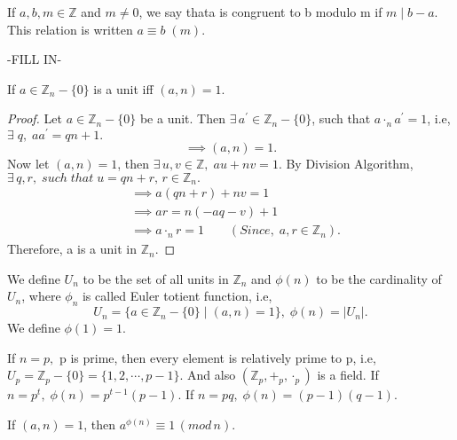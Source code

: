 \documentclass[10pt,a4paper]{article}
\begin{document}
\begin{definition}[]
If $a,b,m\in\mathbb{Z}$ and $m\neq0$, we say thata is congruent to b modulo m if  $m\mid b-a$. This relation is written $a\equiv b\;(m).$
\end{definition}

\begin{definition}
-FILL IN-
\end{definition}

\begin{theorem}
If $a\in\mathbb{Z}_n-\{0\}$ is a unit iff $(a,n)=1.$
\end{theorem}

\begin{proof}
Let $a\in\mathbb{Z}_n-\{0\}$ be a unit. Then $\exists\,a^\prime\in\mathbb{Z}_n-\{0\}$, such that $a\cdot_n a^\prime=1$, i.e, $\exists\;q,\;aa^\prime=qn+1.$ $$\implies (a,n)=1.$$ 
Now let $(a,n)=1$, then $\exists\,u,v\in\mathbb{Z},\;au+nv=1$. By Division Algorithm, $\exists\,q,r,\;such\;that\;u=qn+r,\,r\in\mathbb{Z}_n.$
\begin{align*}
&\implies a(qn+r)+nv=1 \\
&\implies ar=n(-aq-v)+1 \\
&\implies a\cdot_n r=1 \qquad(Since,\;a,r\in\mathbb{Z}_n).
\end{align*}
Therefore, a is a unit in $\mathbb{Z}_n.$
\end{proof}

\begin{definition}
We define $U_n$ to be the set of all units in $\mathbb{Z}_n$ and $\phi(n)$ to be the cardinality of $U_n$, where $\phi_n$ is called Euler totient function, i.e, $$U_n=\{a\in\mathbb{Z}_n-\{0\}\mid (a,n)=1\},\;\phi(n)=\vert U_n\vert.$$
We define $\phi(1)=1.$
\end{definition}

\begin{remark}
If $n=p,$ p is prime, then every element is relatively prime to p, i.e, $U_p=\mathbb{Z}_p-\{0\}=\{1,2,\cdots,p-1\}$. And also $(\mathbb{Z}_p,+_p,\cdot_p)$ is a field. If $n=p^t,\;\phi(n)=p^{t-1}(p-1).$ If $n=pq,\;\phi(n)=(p-1)(q-1).$
\end{remark}

\begin{theorem}
If $(a,n)=1$, then $a^{\phi(n)}\equiv 1\,(mod\,n).$
\end{theorem}
\end{document}
